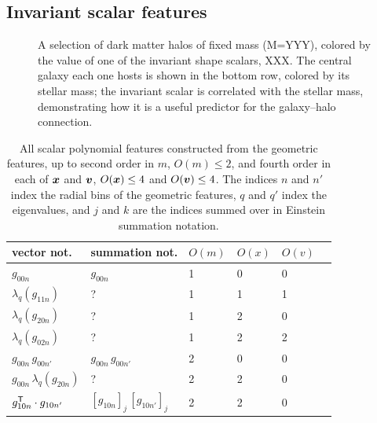 \subsection{Invariant scalar features}
\label{sec:scalar_features}

\begin{figure}
    \centering
    \caption{A selection of dark matter halos of fixed mass (M=YYY), colored by the value of one of the invariant shape scalars, XXX. The central galaxy each one hosts is shown in the bottom row, colored by its stellar mass; the invariant scalar is correlated with the stellar mass, demonstrating how it is a useful predictor for the galaxy--halo connection.}
    \label{fig:halo_viz}
\end{figure}


\begin{table}
    \caption{All scalar polynomial features constructed from the geometric features, up to second order in $m$,  $O(m) \leq 2$, and fourth order in each of $\bm{x}$ and $\bm{v}$, $O(\bm{x}) \leq 4$ and $O(\bm{v}) \leq 4$. The indices $n$ and $n'$ index the radial bins of the geometric features, $q$ and $q'$ index the eigenvalues, and $j$ and $k$ are the indices summed over in Einstein summation notation.  } 
    \label{tbl:scalar_polynomials}
    \vspace{0.5em}
    \centering
    \begin{tabular}{|l|l|l|l|l|l|}
    \hline
    vector not. & summation not. & $O(m)$ & $O(x)$ & $O(v)$ \\
    \hline
    $g_{00n}$ & $g_{00n}$ & 1 & 0 & 0 \\
    $\lambda_q(g_{11n})$ & ? & 1 & 1 & 1 \\
    $\lambda_q(g_{20n})$ & ? & 1 & 2 & 0 \\
    $\lambda_q(g_{02n})$ & ? & 1 & 2 & 2 \\
    $g_{00n} \, g_{00n'}$ & $g_{00n} \, g_{00n'}$ & 2 & 0 & 0 \\
    $g_{00n} \, \lambda_q(g_{20n})$ & ? & 2 & 2 & 0 \\
    $g_{10n}^{\mathsf{T}} \cdot g_{10n'}$ & $[g_{10n}]_j \, [g_{10n'}]_j$ & 2 & 2 & 0 \\

\end{tabular}
\end{table}
